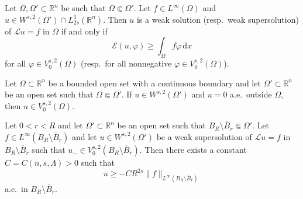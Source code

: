 \documentclass[10pt,a4paper]{amsart}
\begin{document}
\begin{proposition}\label{prop-test}
Let $\Omega, \Omega' \subset \mathbb{R}^n$ be such that $\Omega \Subset \Omega'$. Let $f \in L^\infty(\Omega)$ and $u \in W^{s, 2}(\Omega') \cap L^1_{2s}(\mathbb{R}^n)$. Then $u$ is a weak solution (resp.\ weak supersolution) of $\mathcal{L}u=f$ in $\Omega$ if and only if
\begin{equation*}
\mathcal{E}(u, \varphi) \geq \int_\Omega f\varphi \,\mathrm{d}x
\end{equation*}
for all $\varphi \in V^{s, 2}_0(\Omega)$ \textup{(}resp.\ for all nonnegative $\varphi \in V^{s, 2}_0(\Omega)$\textup{)}.
\end{proposition}

\begin{lemma}\label{lem-test-V}
Let $\Omega \subset \mathbb{R}^n$ be a bounded open set with a continuous boundary and let $\Omega' \subset \mathbb{R}^n$ be an open set such that $\Omega \Subset \Omega'$. If $u \in W^{s, 2}(\Omega')$ and $u=0$ a.e.\ outside $\Omega$, then $u \in V^{s, 2}_0(\Omega)$.
\end{lemma}

\begin{lemma}\label{lem-MP-nonhom}
Let $0<r<R$ and let $\Omega' \subset \mathbb{R}^n$ be an open set such that $B_R \setminus \overline{B}_r \Subset \Omega'$. Let $f \in L^\infty(B_R \setminus \overline{B}_r)$ and let $u \in W^{s, 2}(\Omega')$ be a weak supersolution of $\mathcal{L}u=f$ in $B_R \setminus \overline{B}_r$ such that $u_- \in V^{s, 2}_0(B_R \setminus \overline{B}_r)$. Then there exists a constant $C=C(n, s, \Lambda)>0$ such that
\begin{equation*}
    u \geq -CR^{2s} \|f\|_{L^\infty(B_R \setminus \overline{B}_r)}
\end{equation*}
a.e.\ in $B_R \setminus \overline{B}_r$.
\end{lemma}
\end{document}
